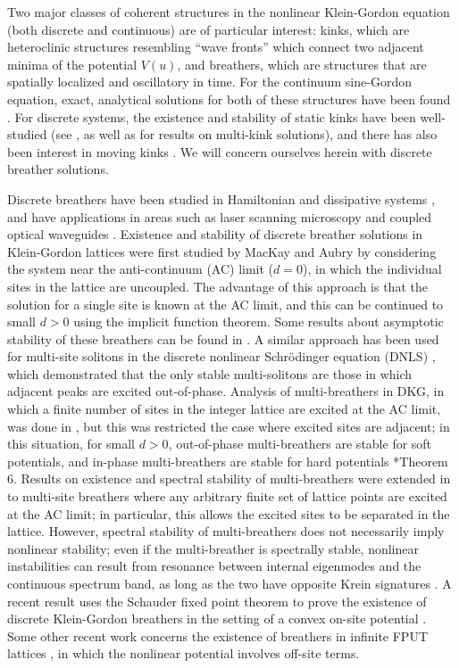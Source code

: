 \documentclass[12pt,reqno]{amsart}
\theoremstyle{definition}
\begin{document}
Two major classes of coherent structures in the nonlinear Klein-Gordon equation (both discrete and continuous) are of particular interest: kinks, which are heteroclinic structures resembling ``wave fronts'' which connect two adjacent minima of the potential $V(u)$, and breathers, which are structures that are spatially localized and oscillatory in time. For the continuum sine-Gordon equation, exact, analytical solutions for both of these structures have been found \cite{SGchapter}. For discrete systems, the existence and stability of static kinks have been well-studied (see \cites{KevrekidisWeinstein2000,SGchapter}, as well as \cite{Parker2021} for results on multi-kink solutions), and there has also been interest in moving kinks \cites{Aigner2003,Iooss2006,Cisneros2008}. We will concern ourselves herein with discrete breather solutions.

Discrete breathers have been studied in Hamiltonian \cite{Flach1998} and dissipative systems \cite{Flach2008a}, and have applications in areas such as laser scanning microscopy and coupled optical waveguides \cite{Flach2008}. Existence and stability of discrete breather solutions in Klein-Gordon lattices were first studied by MacKay and Aubry \cites{MacKay1994,Aubry1997} by considering the system near the anti-continuum (AC) limit ($d=0$), in which the individual sites in the lattice are uncoupled. The advantage of this approach is that the solution for a single site is known at the AC limit, and this can be continued to small $d>0$ using the implicit function theorem. Some results about asymptotic stability of these breathers can be found in \cite{Bambusi2013}. A similar approach has been used for multi-site solitons in the discrete nonlinear Schr\"odinger equation (DNLS) \cite{Pelinovsky2005}, which demonstrated that the only stable multi-solitons are those in which adjacent peaks are excited out-of-phase. Analysis of multi-breathers in DKG, in which a finite number of sites in the integer lattice are excited at the AC limit, was done in \cites{Archilla2003,Koukouloyannis2009}, but this was restricted the case where excited sites are adjacent; in this situation, for small $d>0$, out-of-phase multi-breathers are stable for soft potentials, and in-phase multi-breathers are stable for hard potentials \cite{Archilla2003}*{Theorem 6}. Results on existence and spectral stability of multi-breathers were extended in \cite{Pelinovsky2012} to multi-site breathers where any arbitrary finite set of lattice points are excited at the AC limit; in particular, this allows the excited sites to be separated in the lattice. However, spectral stability of multi-breathers does not necessarily imply nonlinear stability; even if the multi-breather is spectrally stable, nonlinear instabilities can result from resonance between internal eigenmodes and the continuous spectrum band, as long as the two have opposite Krein signatures \cite{cuevas-maraver2016}. A recent result uses the Schauder fixed point theorem to prove the existence of discrete Klein-Gordon breathers in the setting of a convex on-site potential \cite{hennig2021}. Some other recent work concerns the existence of breathers in infinite FPUT lattices \cites{Arioli2019,yoshimura2021}, in which the nonlinear potential involves off-site terms.
\end{document}
